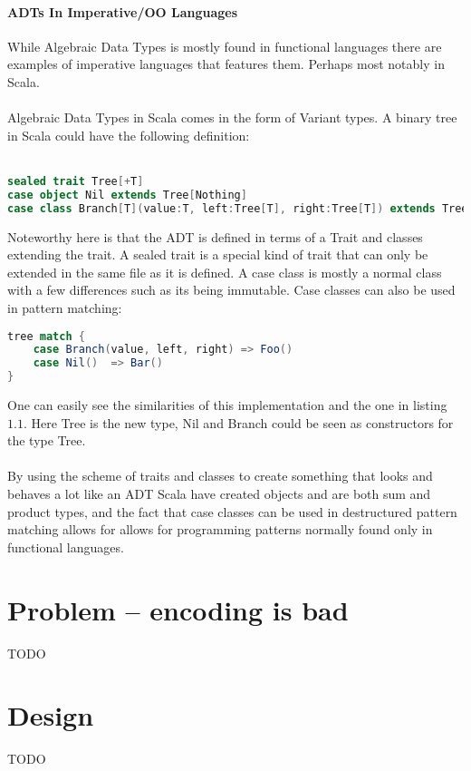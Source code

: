 \documentclass[10pt]{report}
\begin{document}
\subsubsection{ADTs In Imperative/OO Languages}
While Algebraic Data Types is mostly found in functional languages there are examples of imperative languages that features them. Perhaps most notably in Scala.
\\
\\
Algebraic Data Types in Scala comes in the form of Variant types. A binary tree in Scala could have the following definition:
\\
\\

\begin{lstlisting}[language=Scala,caption={ADT definition in Scala},label={lst:e4c_syntax}]
sealed trait Tree[+T]
case object Nil extends Tree[Nothing]
case class Branch[T](value:T, left:Tree[T], right:Tree[T]) extends Tree[T]
\end{lstlisting}
Noteworthy here is that the ADT is defined in terms of a Trait and classes extending the trait.  A sealed trait is a special kind of trait that can only be extended in the same file as it is defined.  A case class is mostly a normal class with a few differences such as its being immutable.  Case classes can also be used in pattern matching:
\begin{lstlisting}[language=Scala,caption={Pattern matching on an ADT in Scala}]
tree match {
    case Branch(value, left, right) => Foo()
    case Nil()  => Bar()
}
\end{lstlisting}
One can easily see the similarities of this implementation and the one in listing $1.1$. Here Tree is the new type, Nil and Branch could be seen as constructors for the type Tree.
\\
\\
By using the scheme of traits and classes to create something that looks and behaves a lot like an ADT Scala have created objects and are both sum and product types, and the fact that case classes can be used in destructured pattern matching allows for allows for programming patterns normally found only in functional languages.
\chapter{Problem -- encoding is bad}
TODO
\chapter{Design}
TODO
\end{document}
